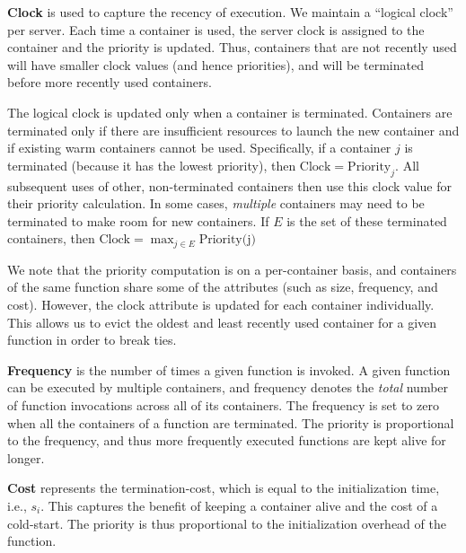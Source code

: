 \noindent \textbf{Clock} is used to capture the recency of execution.
%
We maintain a ``logical clock'' per server.
%
Each time a container is used, the server clock is assigned to the container and the priority is updated. 
%
Thus, containers that are not recently used will have smaller clock values (and hence priorities), and will be terminated before more recently used containers. 

The logical clock is updated only when a container is terminated. 
Containers are terminated only if there are insufficient resources to launch the new container and if existing warm containers cannot be used.  
%
Specifically, if a container  $j$ is terminated (because it has the lowest priority), then $\text{Clock} = \text{Priority}_j$.
All subsequent uses of other, non-terminated containers then use this clock value for their priority calculation.
%
In some cases, \emph{multiple} containers may need to be terminated to make room for new containers.
%
If $E$ is the set of these terminated containers, then $\text{Clock} = \max_{j \in E}{\text{Priority(j)}}$

We note that the priority computation is on a per-container basis, and containers of the same function share some of the attributes (such as size, frequency, and cost). 
However, the clock attribute is updated for each container individually.
This allows us to evict the oldest and least recently used container for a given function in order to break ties. 



\noindent \textbf{Frequency} is the number of times a given function is invoked.
%
A given function can be executed by multiple containers, and frequency denotes the \emph{total} number of function invocations across all of its containers. 
%
The frequency is set to zero when all the containers of a function are terminated.
%
The priority is proportional to the frequency, and thus more frequently executed functions are kept alive for longer. 
%
%


\noindent \textbf{Cost} represents the termination-cost, which is equal to the initialization time, i.e., $s_i$. 
%
This captures the benefit of keeping a container alive and the cost of a cold-start. 
%
The priority is thus proportional to the initialization overhead of the function. 





